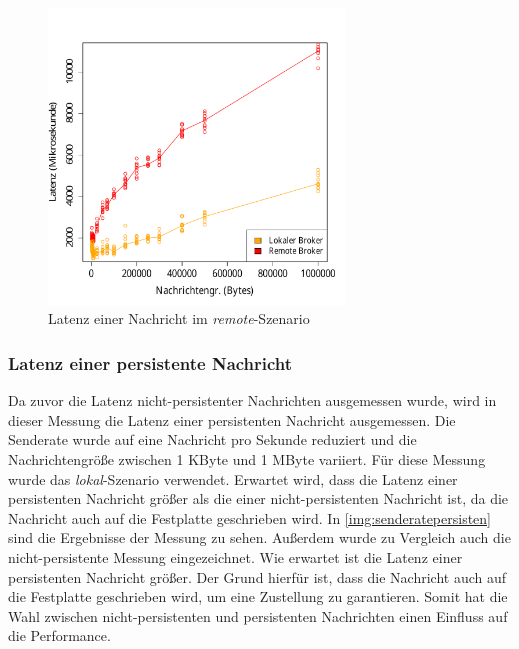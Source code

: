 \begin{figure}
\center
  \includegraphics[width=0.7\textwidth]{images/measurement/rate-limit-1-AvsB.pdf}
  \caption{Latenz einer Nachricht im \textit{remote}-Szenario}
  \label{img:senderate1-B}
\end{figure}

\subsubsection{Latenz einer persistente Nachricht}
Da zuvor die Latenz nicht-persistenter Nachrichten ausgemessen wurde, wird in dieser Messung die Latenz einer persistenten Nachricht ausgemessen. Die Senderate wurde auf eine Nachricht pro Sekunde reduziert und die Nachrichtengröße zwischen 1 KByte und 1 MByte variiert. Für diese Messung wurde das \textit{lokal}-Szenario verwendet. Erwartet wird, dass die Latenz einer persistenten Nachricht größer als die einer nicht-persistenten Nachricht ist, da die Nachricht auch auf die Festplatte geschrieben wird.
In \autoref{img:senderatepersisten} sind die Ergebnisse der Messung zu sehen. Außerdem wurde zu Vergleich auch die nicht-persistente Messung eingezeichnet. Wie erwartet ist die Latenz einer persistenten Nachricht größer. Der Grund hierfür ist, dass die Nachricht auch auf die Festplatte geschrieben wird, um eine Zustellung zu garantieren. Somit hat die Wahl zwischen nicht-persistenten und persistenten Nachrichten einen Einfluss auf die Performance.

